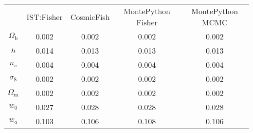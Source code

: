 \begin{table}
\centering
\begin{tabular}{|c|c|c|c|c|}
 & IST:Fisher & CosmicFish & MontePython Fisher & MontePython MCMC \\
$\Omega_\mathrm{b}$ & 0.002 & 0.002 & 0.002 & 0.002 \\
$h$ & 0.014 & 0.013 & 0.013 & 0.013 \\
$n_s$ & 0.004 & 0.004 & 0.004 & 0.004 \\
$\sigma_8$ & 0.002 & 0.002 & 0.002 & 0.002 \\
$\Omega_\mathrm{m}$ & 0.002 & 0.002 & 0.002 & 0.002 \\
$w_0$ & 0.027 & 0.028 & 0.028 & 0.028 \\
$w_a$ & 0.103 & 0.106 & 0.108 & 0.106 \\
\end{tabular}
\end{table}
